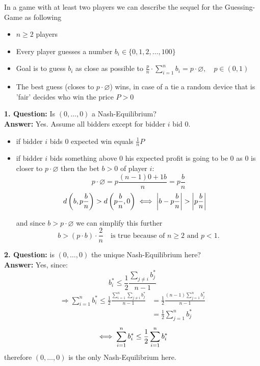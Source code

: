 
\begin{example} 
	In a game with at least two players we can describe the sequel for the Guessing-Game as following
	\begin{itemize}
		\item $n \geq 2$ players
		\item Every player guesses a number $b_{i} \in \{0, 1, 2, \dotsc, 100 \}$
		\item Goal is to guess $b_{i}$ as close as possible to $\frac{p}{n} \cdot \sum_{i = 1}^{n} b_{i} = p \cdot \varnothing, \quad p \in (0, 1)$
		\item The best guess (closes to $p \cdot \varnothing$) wins, in case of a tie a random device that is 'fair' decides who win the price $P > 0$
	\end{itemize}
	
	
	\textbf{1. Question:} Is $(0, \dotsc, 0)$ a Nash-Equilibrium? \\
	\textbf{Answer:} Yes. Assume all bidders except for bidder $i$ bid $0$.	
		\begin{itemize}
			\item if bidder $i$ bids $0$ expected win equals $\frac{1}{n} P $
			\item if bidder $i$ bids something above $0$ his expected profit is going to be $0$ as $0$ is closer to $p \cdot \varnothing$ then the bet $b > 0$ of player $i$:
			\[ p \cdot \varnothing = p \frac{(n - 1)0 + 1 b}{n} = p \frac{b}{n} \]
			\[
				d \left( b, p \frac{b}{n} \right) > d \left( p \frac{b}{n}, 0 \right)	\iff \left| b - p \frac{b}{n} \right| > \left| p \frac{b}{n} \right| \quad
			\]
			
			and since $b > p \cdot \varnothing$ we can simplify this further
			\[ b > \left( p \cdot b \right) \cdot \frac{2}{n} \quad \text{is true because of } n \geq 2 \text{ and } p < 1.\]
		\end{itemize}
		
	
	\textbf{2. Question:} is $(0, \dotsc, 0)$ the unique Nash-Equilibrium here? \\
	\textbf{Answer:} Yes, since:	
	\[ b_{i}^{*} \leq \frac{1}{2} \frac{\sum_{j \neq i} b_{j}^{*}}{n - 1} \]
	\begin{align*}
		\Rightarrow \sum_{i = 1}^{n} b_{i}^{*} \leq \frac{1}{2} \frac{\sum_{i = 1}^{n} \sum_{j \neq i} b_{j}^{*}}{n - 1} & = \frac{1}{2} \frac{(n - 1) \sum_{j = 1}^{n} b_{j}^{*}}{n - 1} \\
		& = \frac{1}{2} \sum_{j = 1}^{n} b_{j}^{*}
	\end{align*} 
	\[ \iff \sum_{i = 1}^{n} b_{i}^{*} \leq \frac{1}{2} \sum_{i = 1}^{n} b_{i}^{*} \]
	therefore $(0, \dotsc,  0)$ is the only Nash-Equilibrium here. \\



\end{example}
